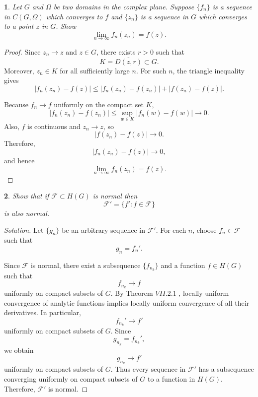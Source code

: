 \documentclass[12pt, a4paper]{report}
\theoremstyle{spaced}
\newtheorem{exercise}{}
\begin{document}
\begin{exercise}
	Let \(G\) and \(\Omega\) be two domains in the complex plane. Suppose
	\(\{f_n\}\) is a sequence in \(C(G,\Omega)\) which converges to \(f\) and
	\(\{z_n\}\) is a sequence in \(G\) which converges to a point \(z\) in \(G\).
	Show
	\[
		\lim_{n\to\infty} f_n(z_n)=f(z).
	\]
\end{exercise}
\begin{proof}
	Since \(z_n\to z\) and \(z\in G\), there exists \(r>0\) such that
	\[
		K=\overline{D(z,r)}\subset G.
	\]
	Moreover, \(z_n\in K\) for all sufficiently large \(n\).
	For such \(n\), the triangle inequality gives
	\[
		|f_n(z_n)-f(z)|
		\leq
		|f_n(z_n)-f(z_n)|
		+
		|f(z_n)-f(z)|.
	\]

	Because \(f_n\to f\) uniformly on the compact set \(K\),
	\[
		|f_n(z_n)-f(z_n)|
		\leq
		\sup_{w\in K}|f_n(w)-f(w)|
		\longrightarrow 0.
	\]
	Also, \(f\) is continuous and \(z_n\to z\), so
	\[
		|f(z_n)-f(z)|\longrightarrow 0.
	\]
	Therefore,
	\[
		|f_n(z_n)-f(z)|\longrightarrow 0,
	\]
	and hence
	\[
		\lim_{n\to\infty}f_n(z_n)=f(z).
	\]
\end{proof}

\begin{exercise}
	Show that if \(\mathcal{F}\subset H(G)\) is normal then
	\[
		\mathcal{F}'=\{f':f\in\mathcal{F}\}
	\]
	is also normal.
\end{exercise}
\begin{proof}[Solution]
	Let \(\{g_n\}\) be an arbitrary sequence in \(\mathcal{F}'\). For each \(n\),
	choose \(f_n\in\mathcal{F}\) such that
	\[
		g_n=f_n'.
	\]

	Since \(\mathcal{F}\) is normal, there exist a subsequence
	\(\{f_{n_k}\}\) and a function \(f\in H(G)\) such that
	\[
		f_{n_k}\longrightarrow f
	\]
	uniformly on compact subsets of \(G\).
	By Theorem \(VII.2.1\) , locally uniform convergence of analytic functions implies
	locally uniform convergence of all their derivatives. In particular,
	\[
		f_{n_k}'\longrightarrow f'
	\]
	uniformly on compact subsets of \(G\).
	Since
	\[
		g_{n_k}=f_{n_k}',
	\]
	we obtain
	\[
		g_{n_k}\longrightarrow f'
	\]
	uniformly on compact subsets of \(G\). Thus every sequence in
	\(\mathcal{F}'\) has a subsequence converging uniformly on compact subsets of
	\(G\) to a function in \(H(G)\).
	Therefore, \(\mathcal{F}'\) is normal.
\end{proof}
\end{document}

